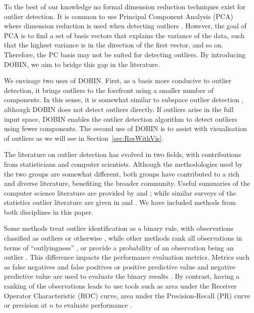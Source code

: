 \documentclass[letter,12pt]{article}
\begin{document}
To the best of our knowledge no formal dimension reduction techniques exist for outlier detection. It is common to use Principal Component Analysis (PCA) where dimension reduction is used when detecting outliers \citep[e.g.,][]{talagala2019anomaly, hyndman2015large}. However, the goal of PCA is to find a set of basis vectors that explains the variance of the data, such that the highest variance is in the direction of the first vector, and so on. Therefore, the PC basis may not be suited for detecting outliers. By introducing DOBIN, we aim to bridge this gap in the literature.

We envisage two uses of DOBIN. First, as a basis more conducive to outlier detection, it brings outliers to the forefront using a smaller number of components. In this sense, it is somewhat similar to subspace outlier detection \citep[e.g.,][]{aggarwal2001outlier, keller2012hics}, although DOBIN does not detect outliers directly. If outliers arise in the full input space, DOBIN enables the outlier detection algorithm to detect outliers using fewer components. The second use of DOBIN is to assist with visualisation of outliers as we will see in Section~\ref{sec:ResWithVis}.

The literature on outlier detection has evolved in two fields, with contributions from statisticians and computer scientists. Although the methodologies used by the two groups are somewhat different, both groups have contributed to a rich and diverse literature, benefiting the broader community. Useful summaries of the computer science literature are provided by \citet{goldstein2016comparative} and \citet{zimek2012survey}; while similar surveys of the statistics outlier literature are given in \citet{rousseeuw2005} and \citet{unwin2019multivariate}. We have included methods from both disciplines in this paper.

Some methods treat outlier identification as a binary rule, with observations classified as outliers or otherwise \citep[e.g.,][]{billor2000bacon, wilkinson2017visualizing, rousseeuw2018detecting}, while other methods rank all observations in terms of ``outlyingness'' \citep[e.g.,][]{breunig2000lof, liu2008isolation}, or provide a probability of an observation being an outlier \citep[e.g.,][]{kriegel2009loop}. This difference impacts the performance evaluation metrics. Metrics such as false negatives and false positives or positive predictive value and negative predictive value are used to evaluate the binary results \citep{wilkinson2017visualizing}. By contrast, having a ranking of the observations leads to use tools such as area under the Receiver Operator Characteristic (ROC) curve, area under the Precision-Recall (PR) curve or precision at $n$ to evaluate performance \citep{campos2016evaluation}.
\end{document}
